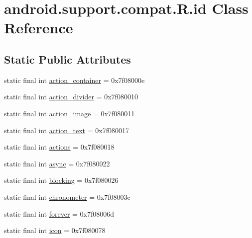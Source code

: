 \hypertarget{classandroid_1_1support_1_1compat_1_1R_1_1id}{}\section{android.\+support.\+compat.\+R.\+id Class Reference}
\label{classandroid_1_1support_1_1compat_1_1R_1_1id}
\subsection*{Static Public Attributes}
\begin{DoxyCompactItemize}
\item 
static final int \mbox{\hyperlink{classandroid_1_1support_1_1compat_1_1R_1_1id_a7f80213ff3a91ef547ef997845e107fa}{action\+\_\+container}} = 0x7f08000e
\item 
static final int \mbox{\hyperlink{classandroid_1_1support_1_1compat_1_1R_1_1id_a88be636aa39ce1c191888969702df488}{action\+\_\+divider}} = 0x7f080010
\item 
static final int \mbox{\hyperlink{classandroid_1_1support_1_1compat_1_1R_1_1id_a70b58cd3ef96e20e98a2c558648a9df6}{action\+\_\+image}} = 0x7f080011
\item 
static final int \mbox{\hyperlink{classandroid_1_1support_1_1compat_1_1R_1_1id_a4c632b55a9592c7a9bccd823efbfab93}{action\+\_\+text}} = 0x7f080017
\item 
static final int \mbox{\hyperlink{classandroid_1_1support_1_1compat_1_1R_1_1id_aa1242e1c24112a4831977220dc8f7da4}{actions}} = 0x7f080018
\item 
static final int \mbox{\hyperlink{classandroid_1_1support_1_1compat_1_1R_1_1id_a0b32e72d27792d595387386a89e994b6}{async}} = 0x7f080022
\item 
static final int \mbox{\hyperlink{classandroid_1_1support_1_1compat_1_1R_1_1id_ab36e5d91fa3344d7b8a7dc7c5b762da5}{blocking}} = 0x7f080026
\item 
static final int \mbox{\hyperlink{classandroid_1_1support_1_1compat_1_1R_1_1id_a8a7fe10d3cc006c6e74a4f87a881ab2f}{chronometer}} = 0x7f08003c
\item 
static final int \mbox{\hyperlink{classandroid_1_1support_1_1compat_1_1R_1_1id_a94bea61e1bb09bcae816f3b5f0815f20}{forever}} = 0x7f08006d
\item 
static final int \mbox{\hyperlink{classandroid_1_1support_1_1compat_1_1R_1_1id_ab366864ddd2e01f97092f1b825cc943d}{icon}} = 0x7f080078
\item 

\end{DoxyCompactItemize}

